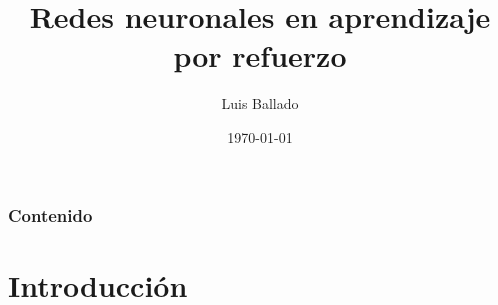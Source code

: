 \documentclass[
	11pt, %
]{beamer}
\title[REDES NEURONALES]{Redes neuronales en aprendizaje por refuerzo} %
\author[Luis Ballado]{Luis Ballado} %
\institute[CINVESTAV]{CINVESTAV - UNIDAD TAMAULIPAS \\ \smallskip \textit{luis.ballado@cinvestav.mx}} %
\date[\today]{\today} %
\begin{document}

\begin{frame}
	\titlepage %
\end{frame}



\begin{frame}
  \frametitle{Contenido} %
  
  \tableofcontents %
\end{frame}


\section{Introducción} %
\end{document}
